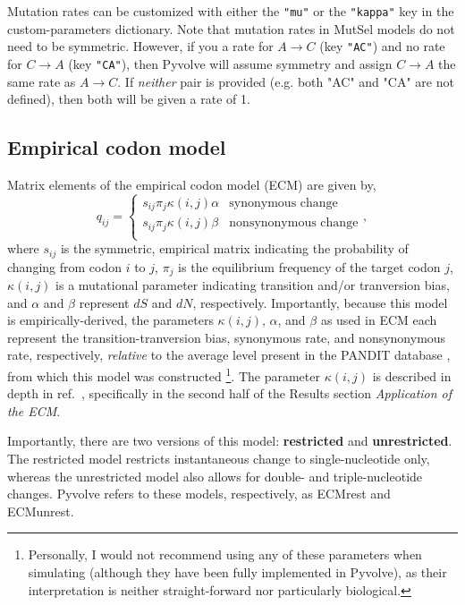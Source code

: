 \documentclass{article}
\newcommand{\code}[1]{\texttt{\small{#1}}}
\begin{document}
Mutation rates can be customized with either the \code{"mu"} or the \code{"kappa"} key in the custom-parameters dictionary. Note that mutation rates in MutSel models do not need to be symmetric. However, if you a rate for $A \rightarrow C$ (key \code{"AC"}) and no rate for $C \rightarrow A$ (key \code{"CA"}), then Pyvolve will assume symmetry and assign $C \rightarrow A$ the same rate as $A \rightarrow C$. If \emph{neither} pair is provided (e.g. both "AC" and "CA" are not defined), then both will be given a rate of 1.



\subsection{Empirical codon model}\label{sec:ecm}

Matrix elements of the empirical codon model (ECM) \citep{ECM} are given by,
\begin{equation}\label{eq:ecmrest}
q_{ij} = \left\{ 
\begin{array}{rl}
s_{ij} \pi_j \kappa(i,j) \alpha      &\text{synonymous change} \\
s_{ij} \pi_j \kappa(i,j) \beta       &\text{nonsynonymous change} \\
\end{array} \right.,
\end{equation}
where $s_{ij}$ is the symmetric, empirical matrix indicating the probability of changing from codon $i$ to $j$, $\pi_j$ is the equilibrium frequency of the target codon $j$, $\kappa(i,j)$ is a mutational parameter indicating transition and/or tranversion bias, and $\alpha$ and $\beta$ represent $dS$ and $dN$, respectively. Importantly, because this model is empirically-derived, the parameters $\kappa(i,j)$, $\alpha$, and $\beta$ as used in ECM each represent the transition-tranversion bias, synonymous rate, and nonsynonymous rate, respectively, \emph{relative} to the average level present in the PANDIT database \citep{PANDIT2006}, from which this model was constructed \footnote{Personally, I would not recommend using any of these parameters when simulating (although they have been fully implemented in Pyvolve), as their interpretation is neither straight-forward nor particularly biological.}. The parameter $\kappa(i,j)$ is described in depth in ref.\ \citep{ECM}, specifically in the second half of the Results section \emph{Application of the ECM}.

Importantly, there are two versions of this model: \textbf{restricted} and \textbf{unrestricted}. The restricted model restricts instantaneous change to single-nucleotide only, whereas the unrestricted model also allows for double- and triple-nucleotide changes. Pyvolve refers to these models, respectively, as ECMrest and ECMunrest. 
\end{document}
